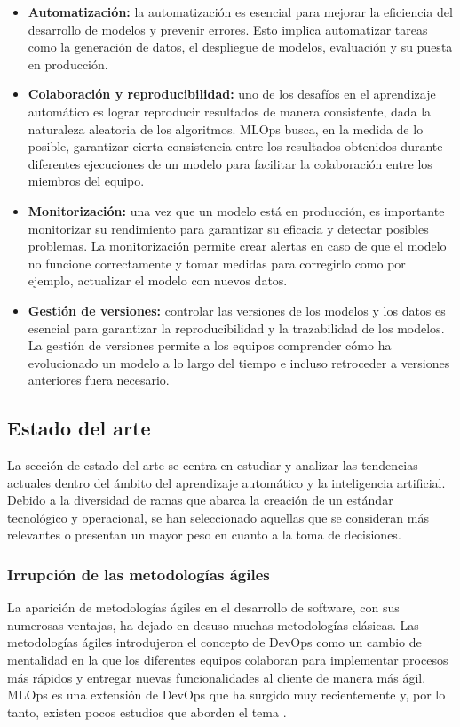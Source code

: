 \begin{itemize}
    \item \textbf{Automatización:} la automatización es esencial para mejorar la eficiencia del
    desarrollo de modelos y prevenir errores. Esto implica automatizar tareas como la 
    generación de datos, el despliegue de modelos, evaluación y su puesta en producción.
    \item \textbf{Colaboración y reproducibilidad:} uno de los desafíos en el aprendizaje automático es lograr 
    reproducir resultados de manera consistente, dada la naturaleza aleatoria de los algoritmos.
    MLOps busca, en la medida de lo posible, garantizar cierta consistencia entre los resultados
    obtenidos durante diferentes ejecuciones de un modelo para facilitar la colaboración entre
    los miembros del equipo.
    \item \textbf{Monitorización:} una vez que un modelo está en producción, es importante monitorizar
    su rendimiento para garantizar su eficacia y detectar posibles problemas. La monitorización
    permite crear alertas en caso de que el modelo no funcione correctamente y tomar medidas
    para corregirlo como por ejemplo, actualizar el modelo con nuevos datos.
    \item \textbf{Gestión de versiones:} controlar las versiones de los modelos y los datos es esencial
    para garantizar la reproducibilidad y la trazabilidad de los modelos. La gestión de versiones
    permite a los equipos comprender cómo ha evolucionado un modelo a lo largo del tiempo e incluso
    retroceder a versiones anteriores fuera necesario.
\end{itemize}

\subsection{Estado del arte}
La sección de estado del arte se centra en estudiar y analizar las tendencias
actuales dentro del ámbito del aprendizaje automático y la inteligencia artificial.
Debido a la diversidad de ramas que abarca la creación de un estándar tecnológico y
operacional, se han seleccionado aquellas que se consideran más relevantes o presentan
un mayor peso en cuanto a la toma de decisiones.

\subsubsection{Irrupción de las metodologías ágiles}
La aparición de metodologías ágiles en el desarrollo de software, con sus numerosas ventajas, 
ha dejado en desuso muchas metodologías clásicas. Las metodologías ágiles introdujeron el 
concepto de DevOps como un cambio de mentalidad \cite{salvucci2021mlops} 
en la que los diferentes equipos colaboran para implementar procesos más rápidos y 
entregar nuevas funcionalidades al cliente de manera más ágil. MLOps es una extensión de 
DevOps que ha surgido muy recientemente y, por lo tanto, existen pocos estudios que 
aborden el tema \cite{kreuzberger2022mlops}\cite{recupito2022multivocal}.\medskip


